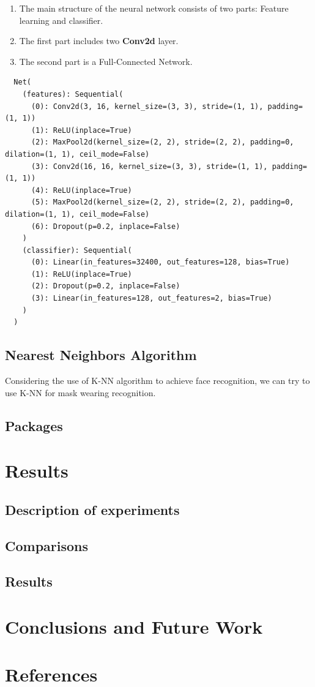 \documentclass{article}
\begin{document}
  \begin{enumerate}
    \item The main structure of the neural network consists of two parts: Feature learning and classifier.
    \item The first part includes two \textbf{Conv2d} layer.
    \item The second part is a Full-Connected Network.
  \end{enumerate}
  \begin{lstlisting}
  Net(
    (features): Sequential(
      (0): Conv2d(3, 16, kernel_size=(3, 3), stride=(1, 1), padding=(1, 1))
      (1): ReLU(inplace=True)
      (2): MaxPool2d(kernel_size=(2, 2), stride=(2, 2), padding=0, dilation=(1, 1), ceil_mode=False)
      (3): Conv2d(16, 16, kernel_size=(3, 3), stride=(1, 1), padding=(1, 1))
      (4): ReLU(inplace=True)
      (5): MaxPool2d(kernel_size=(2, 2), stride=(2, 2), padding=0, dilation=(1, 1), ceil_mode=False)
      (6): Dropout(p=0.2, inplace=False)
    )
    (classifier): Sequential(
      (0): Linear(in_features=32400, out_features=128, bias=True)
      (1): ReLU(inplace=True)
      (2): Dropout(p=0.2, inplace=False)
      (3): Linear(in_features=128, out_features=2, bias=True)
    )
  )
  \end{lstlisting}

  \subsection{Nearest Neighbors Algorithm}
  Considering the use of K-NN algorithm to achieve face recognition, we can try to use K-NN for mask wearing recognition.
  

  \subsection{Packages}


\section{Results}

  \subsection{Description of experiments}

  \subsection{Comparisons}

  \subsection{Results}


\section{Conclusions and Future Work}

\section{References}
\end{document}
